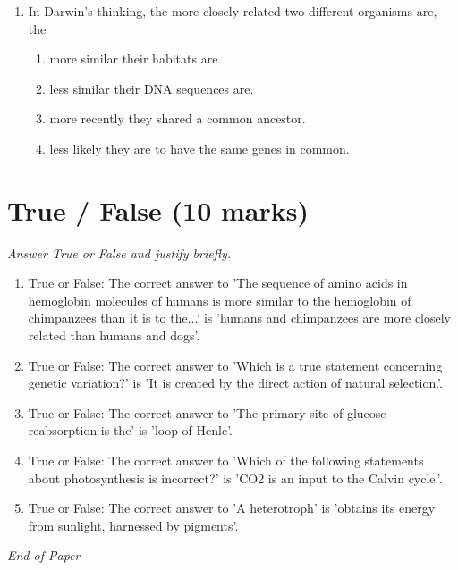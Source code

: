 \documentclass[12pt]{article}
\begin{document}
\begin{enumerate}[label=\arabic*.]
\begin{enumerate}[label=(\alph*)]
    \item directional selection
    \item stabilizing selection
    \item disruptive selection
\end{enumerate}
\item In Darwin's thinking, the more closely related two different organisms are, the
\begin{enumerate}[label=(\alph*)]
    \item more similar their habitats are.
    \item less similar their DNA sequences are.
    \item more recently they shared a common ancestor.
    \item less likely they are to have the same genes in common.
\end{enumerate}
\end{enumerate}

\section*{True / False (10 marks)}
\textit{Answer True or False and justify briefly.}
\begin{enumerate}[label=\arabic*.]
\item True or False: The correct answer to 'The sequence of amino acids in hemoglobin molecules of humans is more similar to the hemoglobin of chimpanzees than it is to the...' is 'humans and chimpanzees are more closely related than humans and dogs'.
\item True or False: The correct answer to 'Which is a true statement concerning genetic variation?' is 'It is created by the direct action of natural selection.'.
\item True or False: The correct answer to 'The primary site of glucose reabsorption is the' is 'loop of Henle'.
\item True or False: The correct answer to 'Which of the following statements about photosynthesis is incorrect?' is 'CO2 is an input to the Calvin cycle.'.
\item True or False: The correct answer to 'A heterotroph' is 'obtains its energy from sunlight, harnessed by pigments'.
\end{enumerate}

\vfill
\noindent\textit{End of Paper}
\end{document}
